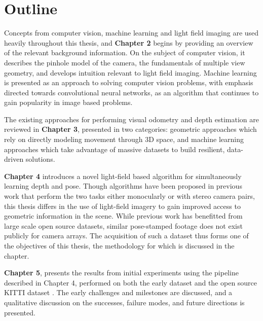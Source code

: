 \section{Outline}
Concepts from computer vision, machine learning and light field imaging are used heavily throughout this thesis, and \textbf{Chapter 2} begins by providing an overview of the relevant background information. On the subject of computer vision, it describes the pinhole model of the camera, the fundamentals of multiple view geometry, and develops intuition relevant to light field imaging. Machine learning is presented as an approach to solving computer vision problems, with emphasis directed towards convolutional neural networks, as an algorithm that continues to gain popularity in image based problems.

The existing approaches for performing visual odometry and depth estimation are reviewed in \textbf{Chapter 3}, presented in two categories: geometric approaches which rely on directly modeling movement through 3D space, and machine learning approaches which take advantage of massive datasets to build resilient, data-driven solutions.

\textbf{Chapter 4} introduces a novel light-field based algorithm for simultaneously learning depth and pose. Though algorithms have been proposed in previous work that perform the two tasks either monocularly or with stereo camera pairs, this thesis differs in the use of light-field imagery to gain improved access to geometric information in the scene. While previous work has benefitted from large scale open source datasets, similar pose-stamped footage does not exist publicly for camera arrays. The acquisition of such a dataset thus forms one of the objectives of this thesis, the methodology for which is discussed in the chapter.

\textbf{Chapter 5}, presents the results from initial experiments using the pipeline described in Chapter 4, performed on both the early dataset and the open source KITTI dataset \cite{dataset-kitti}. The early challenges and milestones are discussed, and a qualitative discussion on the successes, failure modes, and future directions is presented. 

